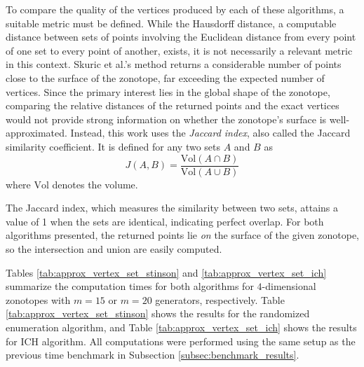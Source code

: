 To compare the quality of the vertices produced by each of these algorithms, a suitable metric must be defined. While the Hausdorff distance, a computable distance between sets of points involving the Euclidean distance from every point of one set to every point of another, exists, it is not necessarily a relevant metric in this context. Skuric et al.'s method returns a considerable number of points close to the surface of the zonotope, far exceeding the expected number of vertices. Since the primary interest lies in the global shape of the zonotope, comparing the relative distances of the returned points and the exact vertices would not provide strong information on whether the zonotope's surface is well-approximated. Instead, this work uses the \emph{Jaccard index}, also called the Jaccard similarity coefficient. It is defined for any two sets $A$ and $B$ as
$$J(A, B) = \frac{\text{Vol}(A\cap B)}{\text{Vol}(A\cup B)}$$ where $\text{Vol}$ denotes the volume. 

The Jaccard index, which measures the similarity between two sets, attains a value of 1 when the sets are identical, indicating perfect overlap. For both algorithms presented, the returned points lie \emph{on} the surface of the given zonotope, so the intersection and union are easily computed.

Tables \ref{tab:approx_vertex_set_stinson} and \ref{tab:approx_vertex_set_ich} summarize the computation times for both algorithms for $4$-dimensional zonotopes with $m=15$ or $m=20$ generators, respectively. Table \ref{tab:approx_vertex_set_stinson} shows the results for the randomized enumeration algorithm, and Table \ref{tab:approx_vertex_set_ich} shows the results for ICH algorithm. All computations were performed using the same setup as the previous time benchmark in Subsection \ref{subsec:benchmark_results}.

